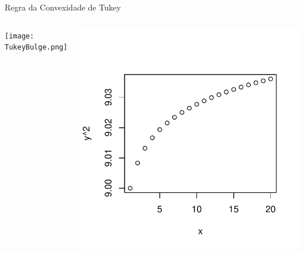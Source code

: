 \documentclass{beamer}\usepackage[]{graphicx}\usepackage[]{color}
\newenvironment{knitrout}{}{} %
\renewenvironment{knitrout}{\setlength{\topsep}{0mm}}{}
\begin{document}
\begin{frame}{Regra da Convexidade de Tukey}

\begin{columns}[c]

\centering
\texttt{[image: TukeyBulge.png]}

\centering
\begin{knitrout}
\color{fgcolor}
\includegraphics[width=0.7\linewidth]{figure/rem9-1} 

\end{knitrout}

\end{columns}

\end{frame}
\end{document}

